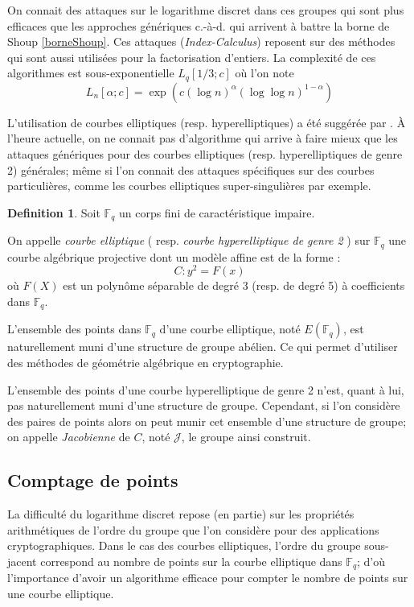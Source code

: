 \documentclass[a4paper]{article}
\theoremstyle{definition}
\newtheorem{definition}{Definition}[section]
\theoremstyle{remark}
\numberwithin{equation}{section}
\begin{document}
On connait des attaques sur le logarithme discret dans ces groupes qui sont plus efficaces que les approches génériques c.-à-d. qui arrivent à battre la borne de Shoup \ref{borneShoup}. Ces attaques (\emph{Index-Calculus}) reposent sur des méthodes qui sont aussi utilisées pour la factorisation d'entiers. La complexité de ces algorithmes est sous-exponentielle $L_q[1/3;c]$ où l'on note
$$L_n[\alpha;c] = \exp(c(\log n)^\alpha(\log \log n)^{1-\alpha})$$

L'utilisation de courbes elliptiques (resp. hyperelliptiques) a été suggérée par \citet{koblitz1,koblitz2}. À l'heure actuelle, on ne connait pas d'algorithme qui arrive à faire mieux que les attaques génériques pour des courbes elliptiques (resp. hyperelliptiques de genre 2) générales; même si l'on connait des attaques spécifiques sur des courbes particulières, comme les courbes elliptiques super-singulières par exemple.

\begin{definition}
Soit $\mathbb{F}_q$ un corps fini de caractéristique impaire.

On appelle \emph{courbe elliptique} ( resp. \emph{courbe hyperelliptique de genre 2} ) sur $\mathbb{F}_q$ une courbe algébrique projective dont un modèle affine est de la forme :
$$C : y^2 = F(x)$$
où $F(X)$ est un polynôme séparable de degré 3 (resp. de degré 5) à coefficients dans $\mathbb{F}_q$.
\end{definition}

L'ensemble des points dans $\mathbb{F}_q$ d'une courbe elliptique, noté $E(\mathbb{F}_q)$, est naturellement muni d'une structure de groupe abélien. Ce qui permet d'utiliser des méthodes de géométrie algébrique en cryptographie.

L'ensemble des points d'une courbe hyperelliptique de genre 2 n'est, quant à lui, pas naturellement muni d'une structure de groupe. Cependant, si l'on considère des paires de points alors on peut munir cet ensemble d'une structure de groupe; on appelle \emph{Jacobienne} de $C$, noté $\mathcal{J}$, le groupe ainsi construit.

\subsection{Comptage de points}
La difficulté du logarithme discret repose (en partie) sur les propriétés arithmétiques de l'ordre du groupe que l'on considère pour des applications cryptographiques. Dans le cas des courbes elliptiques, l'ordre du groupe sous-jacent correspond au nombre de points sur la courbe elliptique dans $\mathbb{F}_q$; d'où l'importance d'avoir un algorithme efficace pour compter le nombre de points sur une courbe elliptique.
\end{document}
